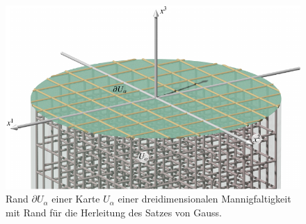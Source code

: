 %
%
%
\begin{figure}
\centering
\includegraphics[width=\textwidth]{chapters/050-gauss/images/gaussrand.pdf}
\caption{Rand $\partial U_\alpha$ einer Karte $U_\alpha$ einer
dreidimensionalen Mannigfaltigkeit mit Rand für die Herleitung des
Satzes von Gauss.
\label{buch:gauss:fig:gaussrand}}
\end{figure}
